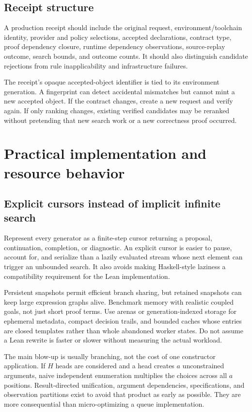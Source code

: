 \subsection{Receipt structure}

A production receipt should include the original request, environment/toolchain
identity, provider and policy selections, accepted declarations, contract type,
proof dependency closure, runtime dependency observations, source-replay
outcome, search bounds, and outcome counts. It should also distinguish candidate
rejections from rule inapplicability and infrastructure failures.

The receipt's opaque accepted-object identifier is tied to its environment
generation. A fingerprint can detect accidental mismatches but cannot mint a
new accepted object. If the contract changes, create a new request and verify
again. If only ranking changes, existing verified candidates may be reranked
without pretending that new search work or a new correctness proof occurred.

\section{Practical implementation and resource behavior}\label{sec:engineering}

\subsection{Explicit cursors instead of implicit infinite search}

Represent every generator as a finite-step cursor returning a proposal,
continuation, completion, or diagnostic. An explicit cursor is easier to pause,
account for, and serialize than a lazily evaluated stream whose next element
can trigger an unbounded search. It also avoids making Haskell-style laziness
a compatibility requirement for the Lean implementation.

Persistent snapshots permit efficient branch sharing, but retained snapshots
can keep large expression graphs alive. Benchmark memory with realistic
coupled goals, not just short proof terms. Use arenas or generation-indexed
storage for ephemeral metadata, compact decision trails, and bounded caches
whose entries are closed templates rather than whole abandoned worker states.
Do not assume a Lean rewrite is faster or slower without measuring the actual
workload.

The main blow-up is usually branching, not the cost of one constructor
application. If $H$ heads are considered and a head creates $a$ unconstrained
arguments, naive independent enumeration multiplies the choices across all
$a$ positions. Result-directed unification, argument dependencies, specifications,
and observation partitions exist to avoid that product as early as possible.
They are more consequential than micro-optimizing a queue implementation.

